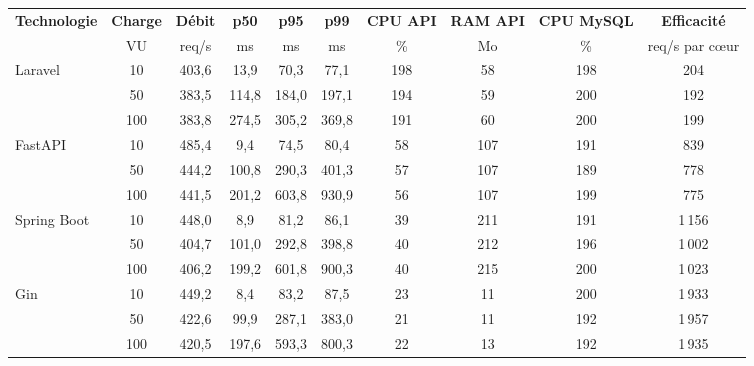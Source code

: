 \begin{tabular}{@{}lccccccccc@{}}
\toprule
\textbf{Technologie} & \textbf{Charge} & \textbf{Débit} & \textbf{p50} & \textbf{p95} & \textbf{p99} & \textbf{CPU API} & \textbf{RAM API} & \textbf{CPU MySQL} & \textbf{Efficacité} \\
 & VU & req/s & ms & ms & ms & \% & Mo & \% & req/s par cœur \\
\midrule
Laravel & 10 & 403,6 & 13,9 & 70,3 & 77,1 & 198 & 58 & 198 & 204 \\
 & 50 & 383,5 & 114,8 & 184,0 & 197,1 & 194 & 59 & 200 & 192 \\
 & 100 & 383,8 & 274,5 & 305,2 & 369,8 & 191 & 60 & 200 & 199 \\
\midrule
FastAPI & 10 & 485,4 & 9,4 & 74,5 & 80,4 & 58 & 107 & 191 & 839 \\
 & 50 & 444,2 & 100,8 & 290,3 & 401,3 & 57 & 107 & 189 & 778 \\
 & 100 & 441,5 & 201,2 & 603,8 & 930,9 & 56 & 107 & 199 & 775 \\
\midrule
Spring Boot & 10 & 448,0 & 8,9 & 81,2 & 86,1 & 39 & 211 & 191 & 1\,156 \\
 & 50 & 404,7 & 101,0 & 292,8 & 398,8 & 40 & 212 & 196 & 1\,002 \\
 & 100 & 406,2 & 199,2 & 601,8 & 900,3 & 40 & 215 & 200 & 1\,023 \\
\midrule
Gin & 10 & 449,2 & 8,4 & 83,2 & 87,5 & 23 & 11 & 200 & 1\,933 \\
 & 50 & 422,6 & 99,9 & 287,1 & 383,0 & 21 & 11 & 192 & 1\,957 \\
 & 100 & 420,5 & 197,6 & 593,3 & 800,3 & 22 & 13 & 192 & 1\,935 \\
\bottomrule
\end{tabular}
